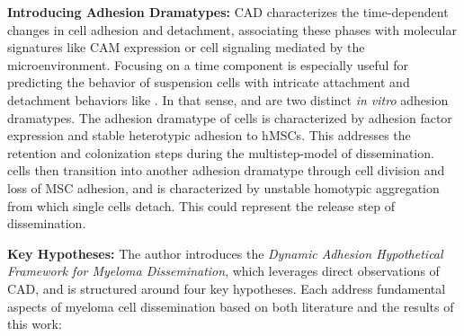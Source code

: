 \textbf{Introducing Adhesion Dramatypes:}
\acf{CAD} characterizes the time-dependent changes in cell
adhesion and detachment, associating these phases with molecular signatures like
\ac{CAM} expression or cell signaling mediated by the microenvironment. Focusing
on a time component is especially useful for predicting the behavior of
suspension cells with intricate attachment and detachment behaviors like \INA.
In that sense, \MAina and \nMAina are two distinct \textit{in vitro} adhesion
dramatypes. The adhesion dramatype of \MAina cells is characterized by adhesion
factor expression and stable heterotypic adhesion to \acp{hMSC}. This addresses
the retention and colonization steps during the multistep-model of
dissemination. \MAina cells then transition into another adhesion dramatype
\dashed{\nMAina} through cell division and loss of MSC adhesion, and is
characterized by unstable homotypic aggregation from which single cells detach.
This could represent the release step of dissemination.


\textbf{Key Hypotheses:}
The author introduces the \emph{Dynamic Adhesion Hypothetical Framework for
      Myeloma Dissemination}, which leverages direct observations of
\ac{CAD}, and is structured around four key hypotheses. Each
address fundamental aspects of myeloma cell dissemination based on both
literature and the results of this work:



\newcommand{\caddramatype}{ %
      \textbf{Myeloma cells change their adhesion dramatype during dissemination.}
      In response to different environmental cues faced during dissemination,
      myeloma cells switch, change or adapt their \ac{CAD}. These states are
      characterized by adhesion dramatpyes\footref{foot:adhesiondt}. Different
      steps in dissemination involve distinct adhesion dramatypes, or instance,
      one for specialized colonizing new sites and one specialized for vascular
      interactions. %
}%
\newcommand{\caddramatypetitle}{ %
      \textit{Hypothesis 1}: Cells Change their Adhesion Dramatype during Dissemination%
}%


\newcommand{\cadplasticity}{ %
      \textbf{Rapid changes of adhesional dramatypes drives aggressive dissemination in myeloma.}
      Adhesional plasticity describes the overall repertoire of adhesion
      dramatypes\footref{foot:adhesiondt} that individual myeloma cells can
      deploy. However, such plasticity is limited by the rapidness of deploying
      a specialized adhesion dramatype during steps of dissemination.
}%
\newcommand{\cadplasticitytitle}{ %
      \textit{Hypothesis 2}: Rapid Adhesional Plasticity Drives Aggression in Myeloma %
}%


